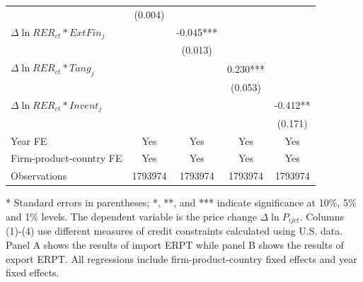 \documentclass[12pt]{article}
\begin{document}
\begin{table}[htbp]
\begin{threeparttable}
\begin{tabular}{lcccc}
			& (0.004) &       &       &  \\
			$\Delta \ln RER_{ct}*ExtFin_{j}$ &       & -0.045*** &       &  \\
			&       & (0.013) &       &  \\
			$\Delta \ln RER_{ct}*Tang_{j}$ &       &       & 0.230*** &  \\
			&       &       & (0.053) &  \\
			$\Delta \ln RER_{ct}*Invent_{j}$ &       &       &       & -0.412** \\
			&       &       &       & (0.171) \\
			Year FE  & Yes   & Yes   & Yes   & Yes \\
			Firm-product-country FE & Yes   & Yes   & Yes   & Yes \\
			Observations & 1793974 & 1793974 & 1793974 & 1793974 \\
			\bottomrule
		\end{tabular}
		\begin{tablenotes}
			\footnotesize
			\item[*] Standard errors in parentheses; *, **, and *** indicate significance at 10\%, 5\% and 1\% levels. The dependent variable is the price change $\Delta \ln P_{ijct}$. Columns (1)-(4) use different measures of credit constraints calculated using U.S. data. Panel A shows the results of import ERPT while panel B shows the results of export ERPT. All regressions include firm-product-country fixed effects and year fixed effects.
		\end{tablenotes}
	\end{threeparttable}
	\label{tab.credit}
\end{table}
\end{document}
